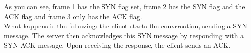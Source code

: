 As you can see, frame 1 has the SYN flag set, frame 2 has the SYN flag and the ACK flag and frame 3 only has the ACK flag. \\
What happens is the following: the client starts the conversation, sending a SYN message. The server then acknowledges this SYN message by responding with a SYN-ACK message.  Upon receiving the response, the client sends an ACK.